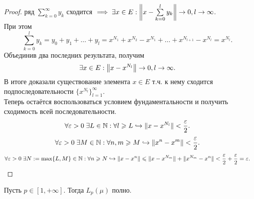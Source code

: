 \begin{proof}
		ряд $\sum\limits_{k=0}^\infty y_k$ сходится $\implies \exists x \in E: \left\|x - \sum\limits_{k=0}^l y_k\right\| \rightarrow 0, l \rightarrow \infty$.\\
		При этом \[
			\sum_{k=0}^l y_k = y_0 + y_1 + \dots + y_l = x^{N_1} + x^{N_2} - x^{N_1} + \dots + x^{N_{l+1}} - x^{N_l} = x^{N_l}.
		\]
		Объединив два последних результата, получим \[
			\exists x \in E: \left\|x - x^{N_l}\right\| \rightarrow 0, l \rightarrow \infty.
		\]
		В итоге доказали существование элемента $x \in E$ т.ч. к нему сходится подпоследовательности $\{x^{N_l}\}_{l=1}^\infty$.\\
		Теперь остаётся воспользоваться условием фундаментальности и получить сходимость всей последовательности.
		\[
			\forall \varepsilon > 0\; \exists L \in \mathbb{N}: \forall l \geqslant L \hookrightarrow \|x - x^{N_l}\| < \frac{\varepsilon}{2}.
		\]\[
			\forall \varepsilon > 0\; \exists M \in \mathbb{N}: \forall n, m \geqslant M \hookrightarrow \|x^n - x^m\| < \frac{\varepsilon}{2}.
		\]\[
			\forall \varepsilon > 0\; \exists N := \max\{L, M\} \in \mathbb{N}: \forall n \geqslant N	 \hookrightarrow \| x - x^n \| \leqslant \| x - x^{N_m}\| + \| x^{N_m} - x^n\| < \frac{\varepsilon}{2} + \frac{\varepsilon}{2} = \varepsilon.
		\]
\end{proof}
\begin{theorem}
	Пусть $p \in [1, +\infty]$. Тогда $L_p(\mu)$ полно.\\
\end{theorem}
